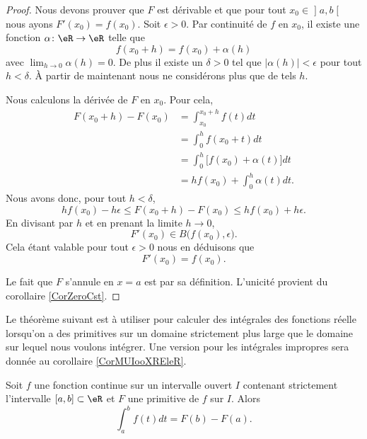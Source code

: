 \begin{proof}
Nous devons prouver que \( F\) est dérivable et que pour tout \( x_0\in\mathopen] a , b \mathclose[\) nous ayons \( F'(x_0)=f(x_0)\). Soit \( \epsilon>0\). Par continuité de \( f\) en \( x_0\), il existe une fonction \( \alpha\colon \eR\to \eR\) telle que
    \begin{equation}
        f(x_0+h)=f(x_0)+\alpha(h)
    \end{equation}
    avec \( \lim_{h\to 0} \alpha(h)=0\). De plus il existe un \( \delta>0\) tel que \( |\alpha(h)|<\epsilon\) pour tout \( h<\delta\). À partir de maintenant nous ne considérons plus que de tels \( h\).

    Nous calculons la dérivée de \( F\) en \( x_0\). Pour cela,
    \begin{subequations}
        \begin{align}
            F(x_0+h)-F(x_0)&=\int_{x_0}^{x_0+h}f(t)dt\\
        &=\int_0^hf(x_0+t)dt\\
        &=\int_0^h\big[ f(x_0)+\alpha(t) \big]dt\\
        &=hf(x_0)+\int_0^{h}\alpha(t)dt.
        \end{align}
    \end{subequations}
    Nous avons donc, pour tout \( h<\delta\),
    \begin{equation}
        hf(x_0)-h\epsilon\leq F(x_0+h)-F(x_0)\leq hf(x_0)+h\epsilon.
    \end{equation}
    En divisant par \( h\) et en prenant la limite \( h\to 0\),
    \begin{equation}
        F'(x_0)\in B\big( f(x_0),\epsilon \big).
    \end{equation}
    Cela étant valable pour tout \( \epsilon>0\) nous en déduisons que
    \begin{equation}
        F'(x_0)=f(x_0).
    \end{equation}

    Le fait que \( F\) s'annule en \( x=a\) est par sa définition. L'unicité provient du corollaire \ref{CorZeroCst}.
\end{proof}

Le théorème suivant est à utiliser pour calculer des intégrales des fonctions réelle lorsqu'on a des primitives sur un domaine strictement plus large que le domaine sur lequel nous voulons intégrer. Une version pour les intégrales impropres sera donnée au corollaire \ref{CorMUIooXREleR}.
\begin{theorem}    \label{ThoRWXooTqHGbC}
    Soit \( f\) une fonction continue sur un intervalle ouvert \( I\) contenant strictement l'intervalle \( \mathopen[ a , b \mathclose]\subset \eR\) et \( F\) une primitive de \( f\) sur \( I\). Alors
    \begin{equation}
        \int_a^bf(t)dt=F(b)-F(a).
    \end{equation}
\end{theorem}

